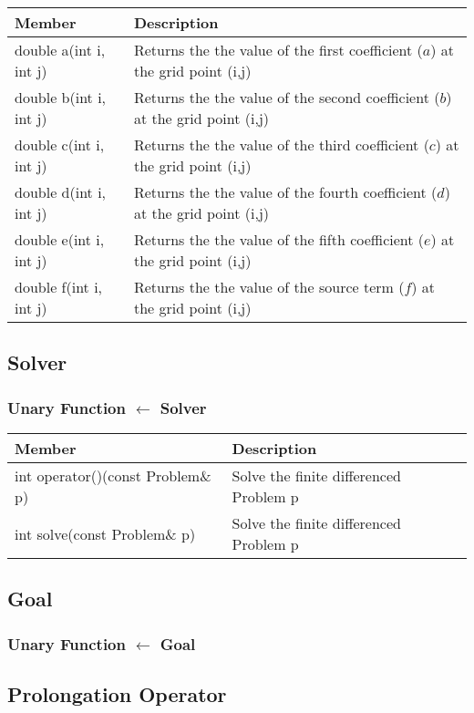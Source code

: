 \documentclass{article}
\begin{document}
\begin{tabular}[!htb]{|l|p{7cm}|}
\hline
Member&	Description\\
\hline
double a(int i, int j)&	Returns the the value of the first coefficient ($a$) at the grid point (i,j)\\
\hline
double b(int i, int j)&	Returns the the value of the second coefficient ($b$) at the grid point (i,j)\\
\hline
double c(int i, int j)&	Returns the the value of the third coefficient ($c$) at the grid point (i,j)\\
\hline
double d(int i, int j)&	Returns the the value of the fourth coefficient ($d$) at the grid point (i,j)\\
\hline
double e(int i, int j)&	Returns the the value of the fifth coefficient ($e$) at the grid point (i,j)\\
\hline
double f(int i, int j)&	Returns the the value of the source term ($f$) at the grid point (i,j)\\
\hline
\end{tabular}

\subsection{Solver}
\subsubsection{Unary Function $\leftarrow$ Solver}

\begin{tabular}[!htb]{|l|p{7cm}|}
\hline
Member&	Description\\
\hline
int operator()(const Problem\& p)&	Solve the finite differenced Problem p\\
\hline
int solve(const Problem\& p)&	Solve the finite differenced Problem p\\
\hline
\end{tabular}
\subsection{Goal}
\subsubsection{Unary Function $\leftarrow$ Goal}

\subsection{Prolongation Operator}
\end{document}
